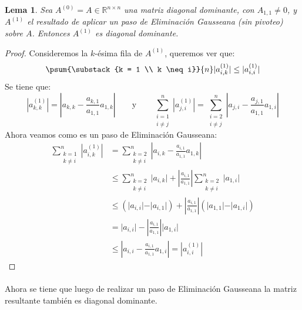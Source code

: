\documentclass[12pt]{article}
\newtheorem{lema}{Lema}
\newcommand{\sub}[3]{\ensuremath{#1_{#2,#3}}}
\begin{document}
\begin{lema}
\label{lema:EG conserva diagonal dominante}
Sea \(A^{(0)} = A \in \mathbb{R}^{n \times n}\) una matriz diagonal dominante, con \(\sub{A}{1}{1} \neq 0\), y \(A^{(1)}\) el resultado de aplicar un paso de Eliminación Gausseana (sin pivoteo) sobre \(A\). Entonces \(A^{(1)}\) es diagonal dominante.
\end{lema}
\begin{proof}
Consideremos la \(k\)-ésima fila de \(A^{(1)}\), queremos ver que:
\[
  \psum{\substack{k = 1 \\ k \neq i}}{n} |a^{(1)}_{i,k}| \leq |a^{(1)}_{i,i} |
\]
Se tiene que:
\[
  | a^{(1)}_{k,k} | = | a_{k,k} - \frac{a_{k,1}}{a_{1,1}} a_{1,k} |
  \qquad \text{y} \qquad
  \sum_{\substack{i = 1 \\ i \neq j}}^n | a^{(1)}_{j,i} |
= \sum_{\substack{i = 2 \\ i \neq j}}^n | a_{j,i} - \frac{a_{j,1}}{a_{1,1}} a_{1,i} |
\]
Ahora veamos como es un paso de Eliminación Gausseana:
\[\begin{split}
  \sum_{\substack{k = 1 \\ k \neq i}}^n | a^{(1)}_{i,k} | & = \sum_{\substack{k = 2 \\ k \neq i}}^n | a_{i,k} - \frac{a_{i,1}}{a_{1,1}} a_{1,k} | \\
                                                          & \leq \sum_{\substack{k = 2 \\ k \neq i}}^n \vert a_{i,k} \vert + \left \vert \frac{a_{i,1}}{a_{1,1}} \right \vert \sum_{\substack{k = 2 \\ k \neq i}}^n \vert a_{1,i} \vert \\
                                                          & \leq \left( \vert a_{i,i} \vert - \vert a_{i,1} \vert \right) + \left \vert \frac{a_{i,1}}{a_{1,1}} \right \vert \left( \vert a_{1,1} \vert - \vert a_{1,i} \vert \right) \\
                                                          & = \vert a_{i,i} \vert - \left \vert \frac{a_{i,1}}{a_{1,1}} \right \vert \vert a_{1,i} \vert \\
                                                          & \leq \left \vert a_{i,i} -  \frac{a_{i,1}}{a_{1,1}} a_{1,i} \right \vert = | a^{(1)}_{i,i} | 
\end{split}\]
\end{proof}

\paragraph{} Ahora se tiene que luego de realizar un paso de Eliminación Gausseana la matriz resultante también es diagonal dominante.
\end{document}
